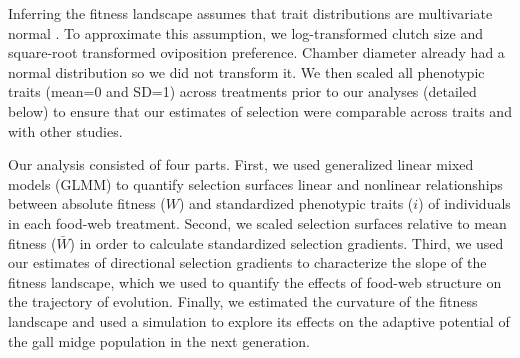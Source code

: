 \documentclass[11pt,]{article}
\begin{document}
Inferring the fitness landscape assumes that trait distributions are
multivariate normal \citep{Lande1983}. To approximate this assumption,
we log-transformed clutch size and square-root transformed oviposition
preference. Chamber diameter already had a normal distribution so we did
not transform it. We then scaled all phenotypic traits (mean=0 and SD=1)
across treatments prior to our analyses (detailed below) to ensure that
our estimates of selection were comparable across traits and with other
studies.

Our analysis consisted of four parts. First, we used generalized linear
mixed models (GLMM) to quantify selection surfaces \textemdash linear
and nonlinear relationships between absolute fitness (\(W\)) and
standardized phenotypic traits (\(i\)) of individuals \textemdash in
each food-web treatment. Second, we scaled selection surfaces relative
to mean fitness (\(\bar W\)) in order to calculate standardized
selection gradients. Third, we used our estimates of directional
selection gradients to characterize the slope of the fitness landscape,
which we used to quantify the effects of food-web structure on the
trajectory of evolution. Finally, we estimated the curvature of the
fitness landscape and used a simulation to explore its effects on the
adaptive potential of the gall midge population in the next generation.
\end{document}
